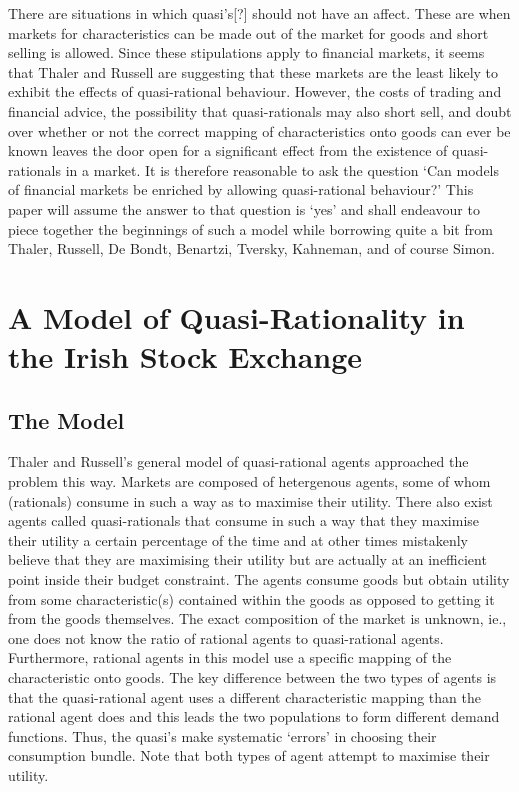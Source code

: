 \documentclass{ucthesis}
\begin{document}
There are situations in which quasi's{\LARGE [?]} should not have an affect.
These are when markets for characteristics can be made out of the market for
goods and short selling is allowed. Since these stipulations apply to
financial markets, it seems that Thaler and Russell \cite[pp. 1076]{quasi}
are suggesting that these markets are the least likely to exhibit the
effects of quasi-rational behaviour. However, the costs of trading and
financial advice, the possibility that quasi-rationals may also short sell,
and doubt over whether or not the correct mapping of characteristics onto
goods can ever be known leaves the door open for a significant effect from
the existence of quasi-rationals in a market. It is therefore reasonable to
ask the question `Can models of financial markets be enriched by allowing
quasi-rational behaviour?' This paper will assume the answer to that
question is `yes' and shall endeavour to piece together the beginnings of
such a model while borrowing quite a bit from Thaler, Russell, De Bondt,
Benartzi, Tversky, Kahneman, and of course Simon.

\chapter{A Model of Quasi-Rationality in the Irish Stock Exchange}

\section{The Model}

Thaler and Russell's general model of quasi-rational agents approached the
problem this way. Markets are composed of hetergenous agents, some of whom
(rationals) consume in such a way as to maximise their utility. There also
exist agents called quasi-rationals that consume in such a way that they
maximise their utility a certain percentage of the time and at other times
mistakenly believe that they are maximising their utility but are actually
at an inefficient point inside their budget constraint. The agents consume
goods but obtain utility from some characteristic(s) contained within the
goods as opposed to getting it from the goods themselves. The exact
composition of the market is unknown, ie., one does not know the ratio of
rational agents to quasi-rational agents. Furthermore, rational agents in
this model use a specific mapping of the characteristic onto goods. The key
difference between the two types of agents is that the quasi-rational agent
uses a different characteristic mapping than the rational agent does and
this leads the two populations to form different demand functions. Thus, the
quasi's make systematic `errors' in choosing their consumption bundle. Note
that both types of agent attempt to maximise their utility.
\end{document}
